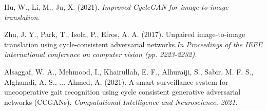 \documentclass[12pt,a4paper]{article}
\begin{document}
\begin{thebibliography}{99}
 Hu, W., Li, M.,  Ju, X. (2021). {\em Improved CycleGAN for image-to-image translation.}

Zhu, J. Y., Park, T., Isola, P.,  Efros, A. A. (2017). Unpaired image-to-image translation using cycle-consistent adversarial networks.{\em In Proceedings of the IEEE international conference on computer vision (pp. 2223-2232).}

Alsaggaf, W. A., Mehmood, I., Khairullah, E. F., Alhuraiji, S., Sabir, M. F. S., Alghamdi, A. S., ... Ahmed, A. (2021). A smart surveillance system for uncooperative gait recognition using cycle consistent generative adversarial networks (CCGANs). {\em Computational Intelligence and Neuroscience, 2021.}

\end{thebibliography}



	
\end{document}
